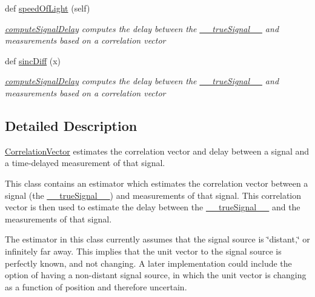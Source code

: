 \begin{DoxyCompactItemize}
def \hyperlink{classmodest_1_1substates_1_1correlationvector_1_1CorrelationVector_a5b95e0a827fb233f2f1a40f2cff9d3f0}{speed\+Of\+Light} (self)
\begin{DoxyCompactList}\small\item\em \hyperlink{classmodest_1_1substates_1_1correlationvector_1_1CorrelationVector_a0d0188e2923b59ba3e620927f1aaf84a}{compute\+Signal\+Delay} computes the delay between the \hyperlink{classmodest_1_1substates_1_1correlationvector_1_1CorrelationVector_af2f52cea1c695f36dd100f529c322e94}{\+\_\+\+\_\+true\+Signal\+\_\+\+\_\+} and measurements based on a correlation vector \end{DoxyCompactList}\item 
def \hyperlink{classmodest_1_1substates_1_1correlationvector_1_1CorrelationVector_a033e07143d7a0aeefb3136d42a380ee3}{sinc\+Diff} (x)
\begin{DoxyCompactList}\small\item\em \hyperlink{classmodest_1_1substates_1_1correlationvector_1_1CorrelationVector_a0d0188e2923b59ba3e620927f1aaf84a}{compute\+Signal\+Delay} computes the delay between the \hyperlink{classmodest_1_1substates_1_1correlationvector_1_1CorrelationVector_af2f52cea1c695f36dd100f529c322e94}{\+\_\+\+\_\+true\+Signal\+\_\+\+\_\+} and measurements based on a correlation vector \end{DoxyCompactList}\end{DoxyCompactItemize}


\subsection{Detailed Description}
\hyperlink{classmodest_1_1substates_1_1correlationvector_1_1CorrelationVector}{Correlation\+Vector} estimates the correlation vector and delay between a signal and a time-\/delayed measurement of that signal. 

This class contains an estimator which estimates the correlation vector between a signal (the \hyperlink{classmodest_1_1substates_1_1correlationvector_1_1CorrelationVector_af2f52cea1c695f36dd100f529c322e94}{\+\_\+\+\_\+true\+Signal\+\_\+\+\_\+}) and measurements of that signal. This correlation vector is then used to estimate the delay between the \hyperlink{classmodest_1_1substates_1_1correlationvector_1_1CorrelationVector_af2f52cea1c695f36dd100f529c322e94}{\+\_\+\+\_\+true\+Signal\+\_\+\+\_\+} and the measurements of that signal.

The estimator in this class currently assumes that the signal source is \char`\"{}distant,\char`\"{} or infinitely far away. This implies that the unit vector to the signal source is perfectly known, and not changing. A later implementation could include the option of having a non-\/distant signal source, in which the unit vector is changing as a function of position and therefore uncertain.

